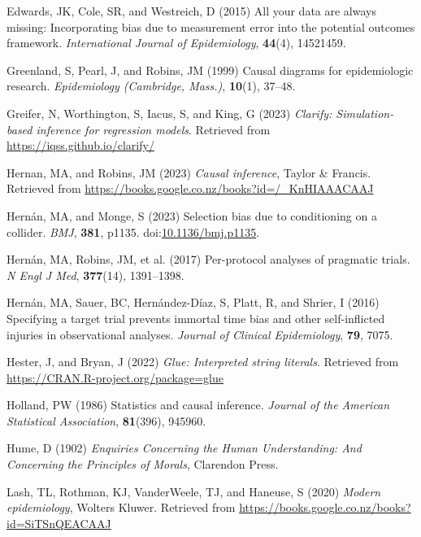 \documentclass[
  singlecolumn]{article}
\newlength{\cslhangindent}
\newenvironment{CSLReferences}[2] %
 {\begin{list}{}{%
  \setlength{\itemindent}{0pt}
  \setlength{\leftmargin}{0pt}
  \setlength{\parsep}{0pt}
  \ifodd #1
   \setlength{\leftmargin}{\cslhangindent}
   \setlength{\itemindent}{-1\cslhangindent}
  \fi
  \setlength{\itemsep}{#2\baselineskip}}}
 {\end{list}}
\begin{document}
\begin{CSLReferences}{1}{0}
Edwards, JK, Cole, SR, and Westreich, D (2015) All your data are always
missing: Incorporating bias due to measurement error into the potential
outcomes framework. \emph{International Journal of Epidemiology},
\textbf{44}(4), 14521459.

Greenland, S, Pearl, J, and Robins, JM (1999) Causal diagrams for
epidemiologic research. \emph{Epidemiology (Cambridge, Mass.)},
\textbf{10}(1), 37--48.

Greifer, N, Worthington, S, Iacus, S, and King, G (2023) \emph{Clarify:
Simulation-based inference for regression models}. Retrieved from
\url{https://iqss.github.io/clarify/}

Hernan, MA, and Robins, JM (2023) \emph{Causal inference}, Taylor \&
Francis. Retrieved from
\url{https://books.google.co.nz/books?id=/_KnHIAAACAAJ}

Hernán, MA, and Monge, S (2023) Selection bias due to conditioning on a
collider. \emph{BMJ}, \textbf{381}, p1135.
doi:\href{https://doi.org/10.1136/bmj.p1135}{10.1136/bmj.p1135}.

Hernán, MA, Robins, JM, et al. (2017) Per-protocol analyses of pragmatic
trials. \emph{N Engl J Med}, \textbf{377}(14), 1391--1398.

Hernán, MA, Sauer, BC, Hernández-Díaz, S, Platt, R, and Shrier, I (2016)
Specifying a target trial prevents immortal time bias and other
self-inflicted injuries in observational analyses. \emph{Journal of
Clinical Epidemiology}, \textbf{79}, 7075.

Hester, J, and Bryan, J (2022) \emph{Glue: Interpreted string literals}.
Retrieved from \url{https://CRAN.R-project.org/package=glue}

Holland, PW (1986) Statistics and causal inference. \emph{Journal of the
American Statistical Association}, \textbf{81}(396), 945960.

Hume, D (1902) \emph{Enquiries Concerning the Human Understanding: And
Concerning the Principles of Morals}, Clarendon Press.

Lash, TL, Rothman, KJ, VanderWeele, TJ, and Haneuse, S (2020)
\emph{Modern epidemiology}, Wolters Kluwer. Retrieved from
\url{https://books.google.co.nz/books?id=SiTSnQEACAAJ}


\end{CSLReferences}
\end{document}
